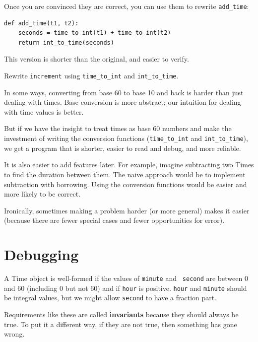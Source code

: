 \documentclass[10pt]{book}
\begin{document}
\begin{CJK}{UTF8}{gbsn}
Once you are convinced they are correct, you can use them to 
rewrite \verb"add_time":

\begin{verbatim}
def add_time(t1, t2):
    seconds = time_to_int(t1) + time_to_int(t2)
    return int_to_time(seconds)
\end{verbatim}
%
This version is shorter than the original, and easier to verify.

\begin{exercise}

Rewrite {\tt increment} using \verb"time_to_int" and \verb"int_to_time".

\end{exercise}

In some ways, converting from base 60 to base 10 and back is harder
than just dealing with times.  Base conversion is more abstract; our
intuition for dealing with time values is better.

But if we have the insight to treat times as base 60 numbers and make
the investment of writing the conversion functions (\verb"time_to_int"
and \verb"int_to_time"), we get a program that is shorter, easier to
read and debug, and more reliable.

It is also easier to add features later.  For example, imagine
subtracting two Times to find the duration between them.  The
naive approach would be to implement subtraction with borrowing.
Using the conversion functions would be easier and more likely to be
correct.

Ironically, sometimes making a problem harder (or more general) makes it
easier (because there are fewer special cases and fewer opportunities
for error).


\section{Debugging}

A Time object is well-formed if the values of {\tt minute} and {\tt
second} are between 0 and 60 (including 0 but not 60) and if 
{\tt hour} is positive.  {\tt hour} and {\tt minute} should be
integral values, but we might allow {\tt second} to have a
fraction part.

Requirements like these are called {\bf invariants} because
they should always be true.  To put it a different way, if they
are not true, then something has gone wrong.


\end{CJK}
\end{document}
